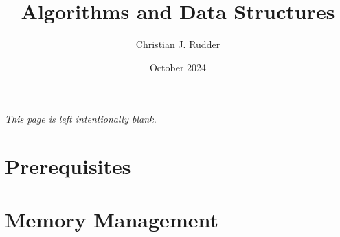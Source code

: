 \documentclass{memoir}
\title{Algorithms and Data Structures}
\author{Christian J. Rudder}
\date{October 2024}
\begin{document}
\maketitle
\setcounter{tocdepth}{2}

\tableofcontents

\newpage
\thispagestyle{empty}
\mbox{}
\vfill
\begin{center}
    \textit{This page is left intentionally blank.}
\end{center}
\vfill
\newpage



\chapter*{Prerequisites}

% 
% 

\chapter{Memory Management}


% 

% 
% 
% 


% 
% 
% 

% 
% 
\end{document}
